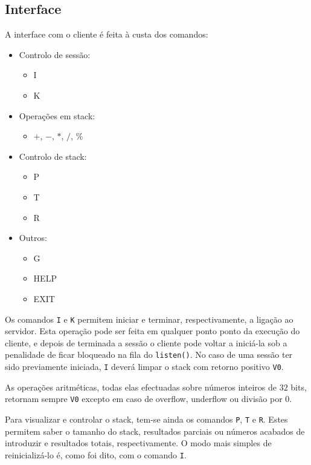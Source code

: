 \subsection{Interface\label{sec:cliente_interface}}

	\indent\indent A interface com o cliente é feita à custa dos comandos:

	\begin{itemize}
		\setlength{\parskip}{-3pt}
		\item{Controlo de sessão:}\begin{itemize}
			\setlength{\parskip}{-3pt}
			\item{I}
			\item{K}
		\end{itemize}
		\item{Operações em stack:}\begin{itemize}
			\setlength{\parskip}{-3pt}
			\item{$+$, $-$, $*$, $/$, $\%$}
		\end{itemize}
		\item{Controlo de stack:}\begin{itemize}
			\setlength{\parskip}{-3pt}
			\item{P}
			\item{T}
			\item{R}
		\end{itemize}
		\item{Outros:}\begin{itemize}
			\setlength{\parskip}{-3pt}
			\item{G}
			\item{HELP}
			\item{EXIT}
		\end{itemize}
	\end{itemize}

	Os comandos \verb|I| e \verb|K| permitem iniciar e terminar, respectivamente, a ligação ao servidor.
	Esta operação pode ser feita em qualquer ponto ponto da execução do cliente, e depois de terminada a sessão o cliente pode voltar a iniciá-la sob a penalidade de ficar bloqueado na fila do \verb|listen()|.
	No caso de uma sessão ter sido previamente iniciada, \verb|I| deverá limpar o stack com retorno positivo \verb|V0|.
	
	As operações aritméticas, todas elas efectuadas sobre números inteiros de $32$ bits, retornam sempre \verb|V0| excepto em caso de overflow, underflow ou divisão por $0$.

	Para visualizar e controlar o stack, tem-se ainda os comandos \verb|P|, \verb|T| e \verb|R|.
	Estes permitem saber o tamanho do stack, resultados parciais ou números acabados de introduzir e resultados totais, respectivamente.
	O modo mais simples de reinicializá-lo é, como foi dito, com o comando \verb|I|.
	
